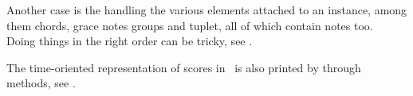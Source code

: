Another case is the handling the various elements attached to an  instance, among them chords, grace notes groups and tuplet, all of which contain notes too. \\
Doing things in the right order can be tricky, see .

The time-oriented representation of scores in \msrRepr\ is also printed by \cascading through  methods, see .
